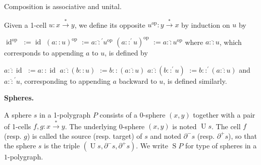 \documentclass[10pt,a4paper]{amsart}
\begin{document}
 
Composition is associative and unital.\par
 
 
 
 
Given a 1-cell $u:x\overset{*}{\to}y$, we define its opposite $u^{\mathrm{op}}:y\overset{*}{\to}x$ by induction on $u$ by\par
    $\displaystyle\operatorname{id}^{\mathrm{op}}$ $\displaystyle:=\operatorname{id}$ $\displaystyle(a::u)^{\mathrm{op}}$ $\displaystyle:=a\mathbin{\overline{::}^{\prime}}u^{\mathrm{op}}$ $\displaystyle(a::^{\prime}u)^{\mathrm{op}}$ $\displaystyle:=a\mathbin{\overline{::}}u^{\mathrm{op}}$    
where $a\mathbin{\overline{::}}u$, which corresponds to appending $a$ to $u$, is defined by\par
    $\displaystyle a\mathbin{\overline{::}}\operatorname{id}$ $\displaystyle:=a::\operatorname{id}$ $\displaystyle a\mathbin{\overline{::}}(b::u)$ $\displaystyle:=b::(a\mathbin{\overline{::}}u)$ $\displaystyle a\mathbin{\overline{::}}(b::^{\prime}u)$ $\displaystyle:=b::^{\prime}(a\mathbin{\overline{::}}u)$    
and $a\mathbin{\overline{::}^{\prime}}u$, corresponding to appending $a$ backward to $u$, is defined similarly.\par
 
 
 
 
\par\medskip\noindent\textbf{Spheres.}\par
 
 
A sphere $s$ in a 1-polygraph $P$ consists of a $0$-sphere $(x,y)$ together with a pair of 1-cells $f,g:x\overset{*}{\to}y$. The underlying 0-sphere $(x,y)$ is noted $\operatorname{U}s$. The cell $f$ (resp. $g$) is called the source (resp. target) of $s$ and noted $\partial^{-}s$ (resp. $\partial^{+}s$), so that the sphere $s$ is the triple $(\operatorname{U}s,\partial^{-}s,\partial^{+}s)$. We write $\operatorname{S}P$ for type of spheres in a $1$-polygraph.\par
 
 
 
\end{document}
